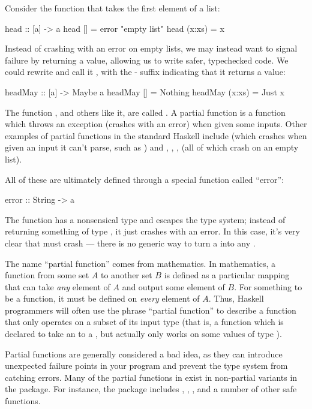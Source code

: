 Consider the  function that takes the first element of a list:
\begin{haskell}
head :: [a] -> a
head [] = error "empty list"
head (x:xs) = x
\end{haskell}
Instead of crashing with an error on empty lists, we may instead want to signal failure by returning
a  value, allowing us to write safer, typechecked code. We could rewrite 
and call it , with the - suffix indicating that it returns a
 value:
\begin{haskell}
headMay :: [a] -> Maybe a
headMay [] = Nothing
headMay (x:xs) = Just x
\end{haskell}

\begin{tangent}[frametitle=Avoiding Partial Functions]
The function , and others like it, are called . A partial
function is a function which throws an exception (crashes with an error) when given some inputs.
Other examples of partial functions in the standard Haskell  include 
(which crashes when given an input it can't parse, such as ) and
, , ,  (all of which crash on an empty list).

All of these are ultimately defined through a special function called ``error'':
\begin{haskell}
error :: String -> a
\end{haskell}
The  function has a nonsensical type and escapes the type system; instead of returning
something of type , it just crashes with an error. In this case, it's very clear that
 must crash --- there is no generic way to turn a  into any .

The name ``partial function'' comes from mathematics. In mathematics, a function from some set $A$
to another set $B$ is defined as a particular mapping that can take \emph{any} element of $A$ and
output some element of $B$. For something to be a function, it must be defined on \emph{every}
element of $A$. Thus, Haskell programmers will often use the phrase ``partial function'' to describe
a function that only operates on a subset of its input type (that is, a function which is declared
to take an  to a , but actually only works on some values of type ).

Partial functions are generally considered a bad idea, as they can introduce unexpected failure
points in your program and prevent the type system from catching errors. Many of the partial
functions in  exist in non-partial variants in the  package. For
instance, the  package includes , , ,
and a number of other safe functions.
\end{tangent}

